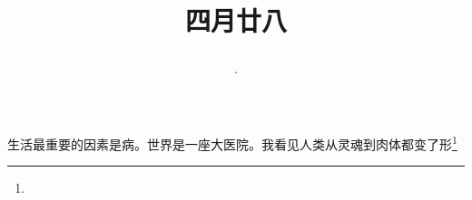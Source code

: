 \title{\date[d=4,m=6,y=2024][year:cn-y,年,month:cn,day:cn,日,·,weekday]·四月廿八 }
生活最重要的因素是病。世界是一座大医院。我看见人类从灵魂到肉体都变了形\footnote{ }

